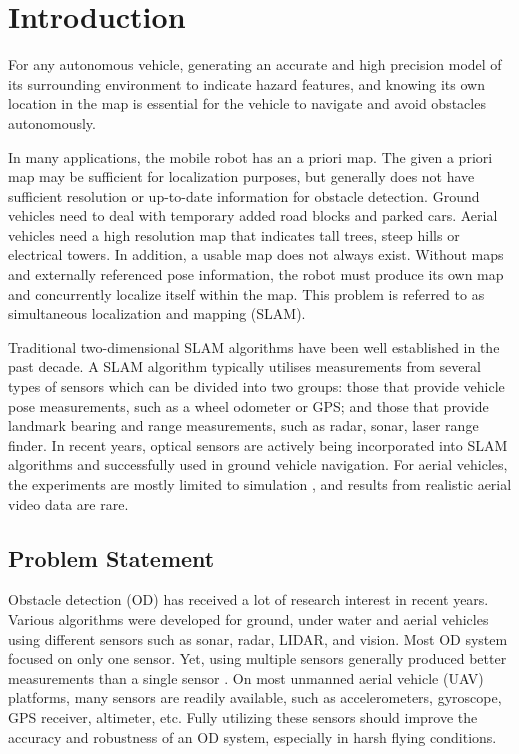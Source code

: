 \chapter{Introduction} \label{ch:intro}
For any autonomous vehicle, generating an accurate and high precision
model of its surrounding environment to indicate hazard features, and
knowing its own location in the map is essential for the vehicle to
navigate and avoid obstacles autonomously.

In many applications, the mobile robot has an a priori map. The given
a priori map may be sufficient for localization purposes, but generally
does not have sufficient resolution or up-to-date information for
obstacle detection. Ground vehicles need to deal with temporary added
road blocks and parked cars. Aerial vehicles need a high resolution map
that indicates tall trees, steep hills or electrical towers. In
addition, a usable map does not always exist. Without maps and
externally referenced pose information, the robot must produce its own
map and concurrently localize itself within the map. This problem is
referred to as simultaneous localization and mapping (SLAM).

Traditional two-dimensional SLAM algorithms have been well established in
the past decade. A SLAM algorithm typically utilises measurements from
several types of sensors which can be divided into two groups: those
that provide vehicle pose measurements, such as a wheel odometer or
GPS; and those that provide landmark bearing and range measurements,
such as radar, sonar, laser range finder. In recent years, optical
sensors are actively being incorporated into SLAM algorithms and
successfully used in ground vehicle navigation. For aerial vehicles,
the experiments are mostly limited to
simulation\cite{nemra_robust_2010} \cite{jianli_unscented_2011}
\cite{sunderhauf_using_2007} \cite{artieda_visual_2009}, and results
from realistic aerial video data are rare.

\section{Problem Statement}\label{section:ProblemStatement}
Obstacle detection (OD) has received a lot of research interest in
recent years. Various algorithms were developed for ground, under
water and aerial vehicles using different sensors such as sonar, radar,
LIDAR, and vision. Most OD system focused on only one sensor. Yet,
using multiple sensors generally produced better measurements than
a single sensor \cite{smith_approaches_2006}. On most unmanned aerial
vehicle (UAV) platforms, many sensors are readily available, such as
accelerometers, gyroscope, GPS receiver, altimeter, etc. Fully
utilizing these sensors should improve the accuracy and robustness of
an OD system, especially in harsh flying conditions.

